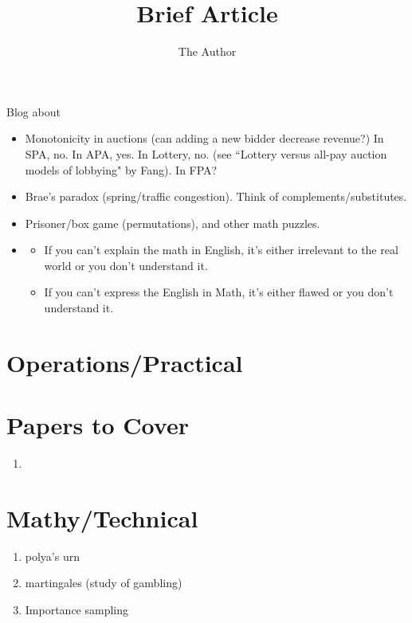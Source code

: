 \documentclass[11pt, oneside]{article}   	%
\title{Brief Article}
\author{The Author}
\begin{document}
\maketitle

Blog about 
\begin{itemize}
\item Monotonicity in auctions (can adding a new bidder decrease revenue?) In SPA, no. In APA, yes. In Lottery, no. (see ``Lottery versus all-pay auction models of lobbying" by Fang). In FPA?
\item Brae's paradox (spring/traffic congestion). Think of complements/substitutes.
\item Prisoner/box game (permutations), and other math puzzles.
\item
\begin{itemize}
\item If you can't explain the math in English, it's either irrelevant to the real world or you don't understand it. 
\item If you can't express the English in Math, it's either flawed or you don't understand it.
\end{itemize}
\end{itemize}

\section{Operations/Practical}


\section{Papers to Cover}

\begin{enumerate}
\item
\end{enumerate}


\section{Mathy/Technical}
\begin{enumerate}
\item polya's urn
\item martingales (study of gambling)
\item Importance sampling
\end{enumerate}
\end{document}
